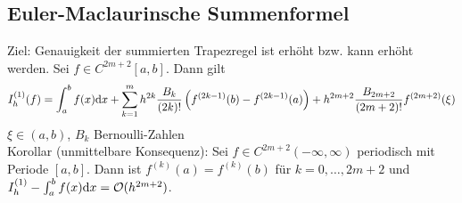 \subsection{Euler-Maclaurinsche Summenformel}
Ziel: Genauigkeit der summierten Trapezregel ist erhöht bzw. kann erhöht werden.
 Sei $f \in C^{2m+2}[a,b]$. Dann gilt
\begin{align*}
  I_h^{(1)}(f) = \int_a^b f(x) \mathrm{d}x + \sum^{m}_{k=1} h^{2k} \frac{B_k}{(2k)!} \left(f^{(2k-1)}(b) -
  f^{(2k-1)}(a)\right) + h^{2m+2}\frac{B_{2m+2}}{(2m+2)!} f^{(2m+2)}(\xi)
\end{align*}
$\xi \in (a,b)$, $B_k$ Bernoulli-Zahlen\\
Korollar (unmittelbare Konsequenz): Sei $f \in C^{2m+2}(-\infty, \infty)$ periodisch mit Periode $[a,b]$.
Dann ist $f^{(k)}(a) = f^{(k)}(b)$ für $k=0,\ldots,2m+2$ und 
$I_h^{(1)} - \int_a^b f(x) \mathrm{d}x = \mathcal{O}(h^{2m+2})$.

